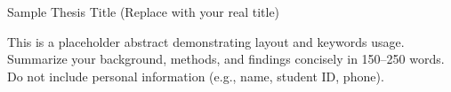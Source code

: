 \begin{enabstract}{Sample Thesis Title (Replace with your real title)}

This is a placeholder abstract demonstrating layout and keywords usage. Summarize your background, methods, and findings concisely in 150–250 words. Do not include personal information (e.g., name, student ID, phone).

\end{enabstract}

